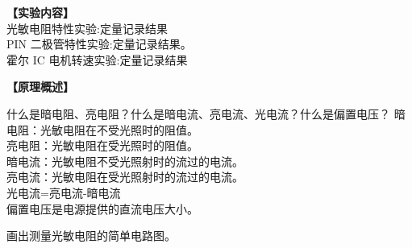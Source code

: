 \documentclass[dvipsnames, svgnames,a4paper,11pt]{article}
\begin{document}
\textbf{【实验内容】}\\

光敏电阻特性实验:定量记录结果\\
PIN 二极管特性实验:定量记录结果。\\
霍尔 IC 电机转速实验:定量记录结果

\textbf{【原理概述】}
\begin{question}
    什么是暗电阻、亮电阻？什么是暗电流、亮电流、光电流？什么是偏置电压？
    \tcblower
    暗电阻：光敏电阻在不受光照时的阻值。\\
    亮电阻：光敏电阻在受光照时的阻值。\\
    暗电流：光敏电阻不受光照射时的流过的电流。\\
    亮电流：光敏电阻在受光照射时的流过的电流。\\
    光电流=亮电流-暗电流\\
    偏置电压是电源提供的直流电压大小。
\end{question}

\begin{question}
    画出测量光敏电阻的简单电路图。
    \tcblower
    \begin{figure}[H]     
		\centering  %
			
	\end{figure}  
\end{question}
\end{document}
